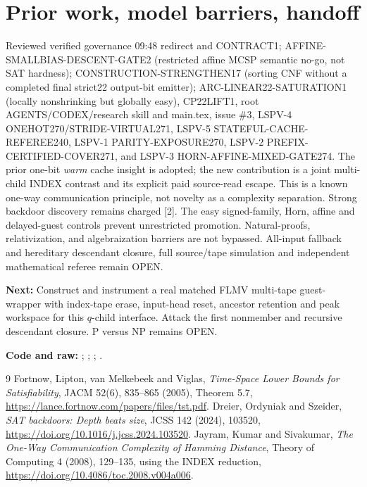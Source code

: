 \documentclass[11pt]{article}
\begin{document}
\section{Prior work, model barriers, handoff}
Reviewed verified governance 09:48 redirect and CONTRACT1; AFFINE-SMALLBIAS-DESCENT-GATE2 (restricted affine MCSP semantic no-go, not SAT hardness); CONSTRUCTION-STRENGTHEN17 (sorting CNF without a completed final strict22 output-bit emitter); ARC-LINEAR22-SATURATION1 (locally nonshrinking but globally easy), CP22LIFT1, root AGENTS/CODEX/research skill and main.tex, issue \#3, LSPV-4 ONEHOT270/STRIDE-VIRTUAL271, LSPV-5 STATEFUL-CACHE-REFEREE240, LSPV-1 PARITY-EXPOSURE270, LSPV-2 PREFIX-CERTIFIED-COVER271, and LSPV-3 HORN-AFFINE-MIXED-GATE274. The prior one-bit \emph{warm} cache insight is adopted; the new contribution is a joint multi-child INDEX contrast and its explicit paid source-read escape. This is a known one-way communication principle, not novelty as a complexity separation. Strong backdoor discovery remains charged [2]. The easy signed-family, Horn, affine and delayed-guest controls prevent unrestricted promotion. Natural-proofs, relativization, and algebraization barriers are not bypassed. All-input fallback and hereditary descendant closure, full source/tape simulation and independent mathematical referee remain OPEN.

\noindent\textbf{Next:} Construct and instrument a real matched FLMV multi-tape guest-wrapper with index-tape erase, input-head reset, ancestor retention and peak workspace for this $q$-child interface. Attack the first nonmember and recursive descendant closure. P versus NP remains OPEN.

\noindent\textbf{Code and raw:}
;
;
;
.
\begin{thebibliography}{9}
 Fortnow, Lipton, van Melkebeek and Viglas, \emph{Time-Space Lower Bounds for Satisfiability}, JACM 52(6), 835--865 (2005), Theorem 5.7, \url{https://lance.fortnow.com/papers/files/tst.pdf}.
 Dreier, Ordyniak and Szeider, \emph{SAT backdoors: Depth beats size}, JCSS 142 (2024), 103520, \url{https://doi.org/10.1016/j.jcss.2024.103520}.
 Jayram, Kumar and Sivakumar, \emph{The One-Way Communication Complexity of Hamming Distance}, Theory of Computing 4 (2008), 129--135, using the INDEX reduction, \url{https://doi.org/10.4086/toc.2008.v004a006}.
\end{thebibliography}
\end{document}
